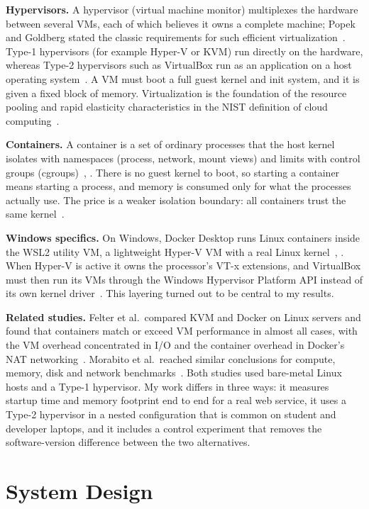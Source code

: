\documentclass[conference,a4paper]{IEEEtran}
\begin{document}
\textbf{Hypervisors.} A hypervisor (virtual machine monitor) multiplexes the hardware between several VMs, each of which believes it owns a complete machine; Popek and Goldberg stated the classic requirements for such efficient virtualization~\cite{popek}. Type-1 hypervisors (for example Hyper-V or KVM) run directly on the hardware, whereas Type-2 hypervisors such as VirtualBox run as an application on a host operating system~\cite{west}. A VM must boot a full guest kernel and init system, and it is given a fixed block of memory. Virtualization is the foundation of the resource pooling and rapid elasticity characteristics in the NIST definition of cloud computing~\cite{nist}.

\textbf{Containers.} A container is a set of ordinary processes that the host kernel isolates with namespaces (process, network, mount views) and limits with control groups (cgroups)~\cite{dockercontainer}, \cite{dockerlimits}. There is no guest kernel to boot, so starting a container means starting a process, and memory is consumed only for what the processes actually use. The price is a weaker isolation boundary: all containers trust the same kernel~\cite{dockersec}.

\textbf{Windows specifics.} On Windows, Docker Desktop runs Linux containers inside the WSL2 utility VM, a lightweight Hyper-V VM with a real Linux kernel~\cite{wsl}, \cite{dockerwsl}. When Hyper-V is active it owns the processor's VT-x extensions, and VirtualBox must then run its VMs through the Windows Hypervisor Platform API instead of its own kernel driver~\cite{vboxman}. This layering turned out to be central to my results.

\textbf{Related studies.} Felter et al.\ compared KVM and Docker on Linux servers and found that containers match or exceed VM performance in almost all cases, with the VM overhead concentrated in I/O and the container overhead in Docker's NAT networking~\cite{felter}. Morabito et al.\ reached similar conclusions for compute, memory, disk and network benchmarks~\cite{morabito}. Both studies used bare-metal Linux hosts and a Type-1 hypervisor. My work differs in three ways: it measures startup time and memory footprint end to end for a real web service, it uses a Type-2 hypervisor in a nested configuration that is common on student and developer laptops, and it includes a control experiment that removes the software-version difference between the two alternatives.

\section{System Design}
\label{sec:design}
\end{document}
